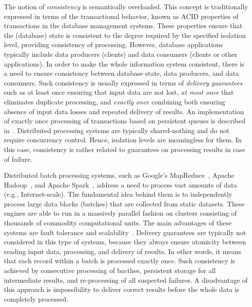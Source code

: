 
\label {fs-intro-seciton}

The notion of {\em consistency} is semantically overloaded. This concept is traditionally expressed in terms of the transactional behavior, known as ACID properties of transactions in the database management systems. These properties ensure that the (database) state is consistent to the degree required by the specified isolation level, providing consistency of processing. However, database applications typically include data producers (clients) and data consumers (clients or other applications). In order to make the whole information system consistent, there is a need to ensure consistency between database state, data producers, and data consumers. Such consistency is usually expressed in terms of {\em delivery guarantees} such as {at least once}  ensuring that input data are not lost, {\em at most once}  that eliminates duplicate processing, and {\em exactly once} combining both ensuring absence of input data losses and repeated delivery of results. An implementation of exactly once processing of transactions based on persistent queues is described in~\cite{DBLP:books/mk/WeikumV2002}. Distributed processing systems are typically shared-nothing and do not require concurrency control. Hence, isolation levels are meaningless for them. In this case, consistency is rather related to guarantees on processing results in case of failure.

Distributed batch processing systems, such as Google's MapReduce~\cite{Dean:2008:MSD:1327452.1327492}, Apache Hadoop~\cite{hadoop2009hadoop}, and Apache Spark~\cite{Zaharia:2016:ASU:3013530.2934664}, address a need to process vast amounts of data (e.g., Internet-scale). The fundamental idea behind them is to independently process large data blocks (batches) that are collected from static datasets. These engines are able to run in a massively parallel fashion on clusters consisting of thousands of commodity computational units. The main advantages of these systems are fault tolerance and scalability~\cite{borthakur2011apache}. Delivery guarantees are typically not considered in this type of systems, because they always ensure atomicity between reading input data, processing, and delivery of results. In other words, it means that each record within a batch is processed exactly once. Such consistency is achieved by consecutive processing of bacthes, persistent storage for all intermediate results, and re-processing of all suspected failures. A disadvantage of this approach is impossibility to deliver correct results before the whole data is completely processed.

